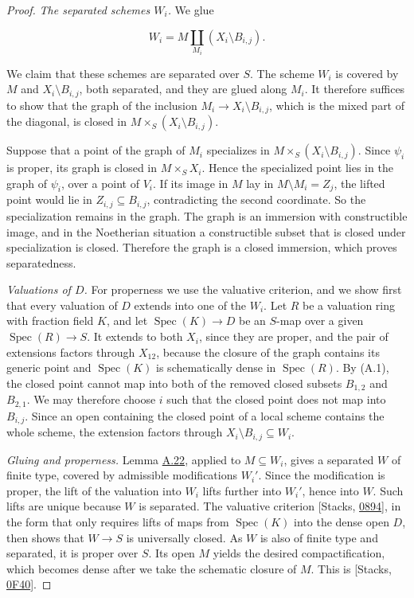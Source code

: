 \documentclass[11pt]{article}
\begin{document}
\begin{proof}[{Proof}]
\emph{The separated schemes \(W_i\).} We glue

\[
W_i=M\coprod_{M_i}(X_i\setminus B_{i,j}).
\]

We claim that these schemes are separated over \(S\). The scheme \(W_i\) is covered by \(M\) and \(X_i\setminus B_{i,j}\), both separated, and they are glued along \(M_i\). It therefore suffices to show that the graph of the inclusion \(M_i\to X_i\setminus B_{i,j}\), which is the mixed part of the diagonal, is closed in \(M\times_S(X_i\setminus B_{i,j})\).

Suppose that a point of the graph of \(M_i\) specializes in \(M\times_S(X_i\setminus B_{i,j})\). Since \(\psi_i\) is proper, its graph is closed in \(M\times_SX_i\). Hence the specialized point lies in the graph of \(\psi_i\), over a point of \(V_i\). If its image in \(M\) lay in \(M\setminus M_i=Z_j\), the lifted point would lie in \(Z_{i,j}\subseteq B_{i,j}\), contradicting the second coordinate. So the specialization remains in the graph. The graph is an immersion with constructible image, and in the Noetherian situation a constructible subset that is closed under specialization is closed. Therefore the graph is a closed immersion, which proves separatedness.

\emph{Valuations of \(D\).} For properness we use the valuative criterion, and we show first that every valuation of \(D\) extends into one of the \(W_i\). Let \(R\) be a valuation ring with fraction field \(K\), and let \(\operatorname{Spec}(K)\to D\) be an \(S\)-map over a given \(\operatorname{Spec}(R)\to S\). It extends to both \(X_i\), since they are proper, and the pair of extensions factors through \(X_{12}\), because the closure of the graph contains its generic point and \(\operatorname{Spec}(K)\) is schematically dense in \(\operatorname{Spec}(R)\). By (A.1), the closed point cannot map into both of the removed closed subsets \(B_{1,2}\) and \(B_{2,1}\). We may therefore choose \(i\) such that the closed point does not map into \(B_{i,j}\). Since an open containing the closed point of a local scheme contains the whole scheme, the extension factors through \(X_i\setminus B_{i,j}\subseteq W_i\).

\emph{Gluing and properness.} Lemma \hyperref[bp58]{A.22}, applied to \(M\subseteq W_i\), gives a separated \(W\) of finite type, covered by admissible modifications \(W_i'\). Since the modification is proper, the lift of the valuation into \(W_i\) lifts further into \(W_i'\), hence into \(W\). Such lifts are unique because \(W\) is separated. The valuative criterion [Stacks, \href{https://stacks.math.columbia.edu/tag/0894}{0894}], in the form that only requires lifts of maps from \(\operatorname{Spec}(K)\) into the dense open \(D\), then shows that \(W\to S\) is universally closed. As \(W\) is also of finite type and separated, it is proper over \(S\). Its open \(M\) yields the desired compactification, which becomes dense after we take the schematic closure of \(M\). This is [Stacks, \href{https://stacks.math.columbia.edu/tag/0F40}{0F40}].
\end{proof}
\end{document}
